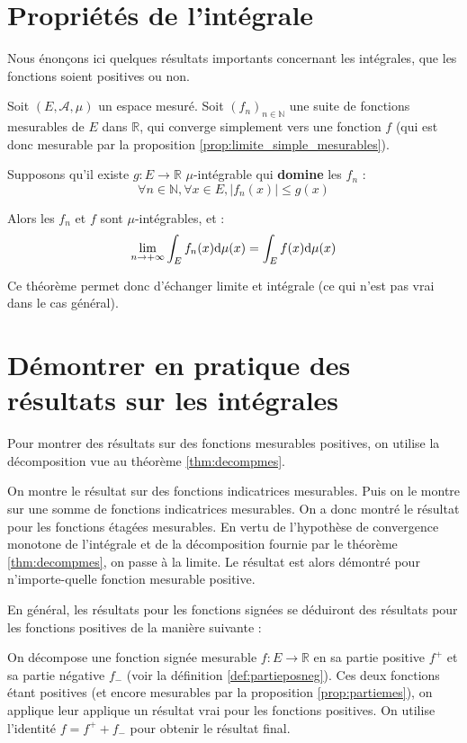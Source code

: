 \documentclass[../integ-proba.tex]{subfiles}
\begin{document}
\section{Propriétés de l'intégrale}

Nous énonçons ici quelques résultats importants concernant les intégrales, que les fonctions soient positives ou non.

\begin{thm}
  \label{thm:convergence_dominee}
  Soit $\left(E,\mathcal{A},\mu\right)$ un espace mesuré.
  Soit $\left(f_n\right)_{n \in \mathbb{N}}$ une suite de fonctions mesurables de $E$ dans $\mathbb{R}$, qui converge simplement vers une fonction $f$ (qui est donc mesurable par la proposition \ref{prop:limite_simple_mesurables}).

  Supposons qu'il existe $g:E \longrightarrow \mathbb{R}$ $\mu$-intégrable qui \textbf{domine} les $f_n$ :
  $$
  \forall n \in \mathbb{N}, \forall x \in E, \left|f_n(x)\right| \leq g(x)
  $$

  Alors les $f_n$ et $f$ sont $\mu$-intégrables, et :
  $$
  \lim_{n \to + \infty} \int_E f_n(x) \textnormal{d}\mu(x) = \int_E f(x) \textnormal{d}\mu(x)
  $$
\end{thm}

\begin{rem}
  Ce théorème permet donc d'échanger limite et intégrale (ce qui n'est pas vrai dans le cas général).
\end{rem}

\section{Démontrer en pratique des résultats sur les intégrales}

Pour montrer des résultats sur des fonctions mesurables positives, on utilise la décomposition vue au théorème \ref{thm:decompmes}.
\begin{itemize}
  \itemb On montre le résultat sur des fonctions indicatrices mesurables.
  \itemb Puis on le montre sur une somme de fonctions indicatrices mesurables. On a donc montré le résultat pour les fonctions étagées mesurables.
  \itemb En vertu de l'hypothèse de convergence monotone de l'intégrale et de la décomposition fournie par le théorème \ref{thm:decompmes}, on passe à la limite.
  Le résultat est alors démontré pour n'importe-quelle fonction mesurable positive.
\end{itemize}

En général, les résultats pour les fonctions signées se déduiront des résultats pour les fonctions positives de la manière suivante :
\begin{itemize}
  \itemb On décompose une fonction signée mesurable $f:E\longrightarrow\mathbb{R}$ en sa partie positive $f^+$ et sa partie négative $f_-$ (voir la définition \ref{def:partieposneg}).
  \itemb Ces deux fonctions étant positives (et encore mesurables par la proposition \ref{prop:partiemes}), on applique leur applique un résultat vrai pour les fonctions positives.
  \itemb On utilise l'identité $f=f^++f_-$ pour obtenir le résultat final.
\end{itemize}
\end{document}
